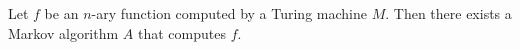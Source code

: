 Let $f$ be an $n$-ary function computed by a Turing machine $M$. Then there exists a Markov algorithm $A$ that computes $f$.
